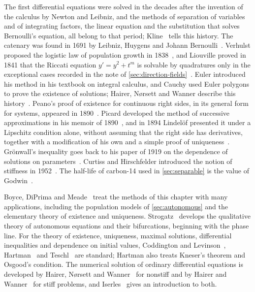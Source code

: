 \chapternotes

The first differential equations were solved in the decades after the invention of the calculus by Newton and Leibniz, and the methods of separation of variables and of integrating factors, the linear equation and the substitution that solves Bernoulli's equation, all belong to that period; Kline~\cite{kline1972} tells this history. The catenary was found in 1691 by Leibniz, Huygens and Johann Bernoulli~\cite{maor1994}. Verhulst proposed the logistic law of population growth in 1838~\cite{verhulst1838}, and Liouville proved in 1841 that the Riccati equation $y'=y^2+t^m$ is solvable by quadratures only in the exceptional cases recorded in the note of \cref{sec:direction-fields}~\cite{liouville1841,watson1944}. Euler introduced his method in his textbook on integral calculus, and Cauchy used Euler polygons to prove the existence of solutions; Hairer, N{\o}rsett and Wanner describe this history~\cite[Chaps.~I and~II]{hairer1993}. Peano's proof of existence for continuous right sides, in its general form for systems, appeared in 1890~\cite{peano1890}. Picard developed the method of successive approximations in his memoir of 1890~\cite{picard1890}, and in 1894 Lindel\"of presented it under a Lipschitz condition alone, without assuming that the right side has derivatives, together with a modification of his own and a simple proof of uniqueness~\cite{lindelof1894}. Gr\"onwall's inequality goes back to his paper of 1919 on the dependence of solutions on parameters~\cite{gronwall1919}. Curtiss and Hirschfelder introduced the notion of stiffness in 1952~\cite{curtiss1952}. The half-life of carbon-14 used in \cref{sec:separable} is the value of Godwin~\cite{godwin1962}.

Boyce, DiPrima and Meade~\cite{boyce2017} treat the methods of this chapter with many applications, including the population models of \cref{sec:autonomous} and the elementary theory of existence and uniqueness. Strogatz~\cite{strogatz2015} develops the qualitative theory of autonomous equations and their bifurcations, beginning with the phase line. For the theory of existence, uniqueness, maximal solutions, differential inequalities and dependence on initial values, Coddington and Levinson~\cite{coddington1955}, Hartman~\cite{hartman2002} and Teschl~\cite{teschl2012} are standard; Hartman also treats Kneser's theorem and Osgood's condition. The numerical solution of ordinary differential equations is developed by Hairer, N{\o}rsett and Wanner~\cite{hairer1993} for nonstiff and by Hairer and Wanner~\cite{hairer1996stiff} for stiff problems, and Iserles~\cite{iserles2008} gives an introduction to both.

\chapterreferences
